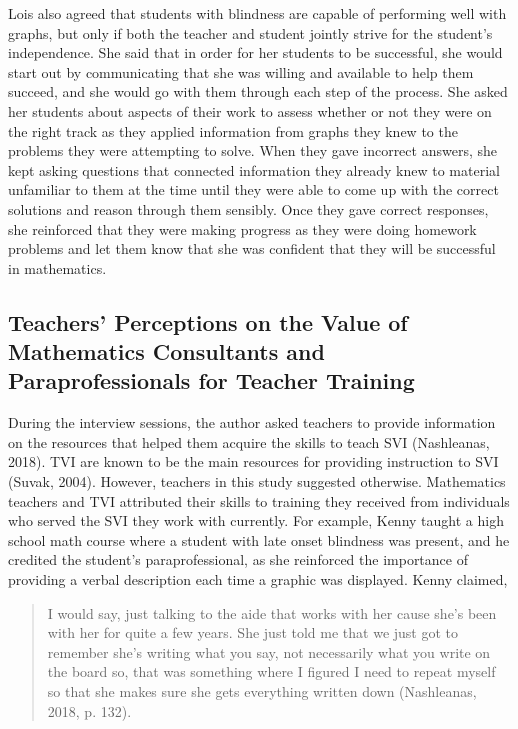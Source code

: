 \documentclass[11.5pt]{sig-alternate} %
\begin{document}
\begin{large}
\begin{quote}
\end{quote}

Lois also agreed that students with blindness are capable of performing well with graphs, but only if both the teacher and student jointly strive for the student's independence. She said that in order for her students to be successful, she would start out by communicating that she was willing and available to help them succeed, and she would go with them through each step of the process. She asked her students about aspects of their work to assess whether or not they were on the right track as they applied information from graphs they knew to the problems they were attempting to solve. When they gave incorrect answers, she kept asking questions that connected information they already knew to material unfamiliar to them at the time until they were able to come up with the correct solutions and reason through them sensibly. Once they gave correct responses, she reinforced that they were making progress as they were doing homework problems and let them know that she was confident that they will be successful in mathematics.
 
\subsection*{Teachers’ Perceptions on the Value of Mathematics Consultants and Paraprofessionals for Teacher Training}

During the interview sessions, the author asked teachers to provide information on the resources that helped them acquire the skills to teach SVI (Nashleanas, 2018). TVI are known to be the main resources for providing instruction to SVI (Suvak, 2004). However, teachers in this study suggested otherwise. Mathematics teachers and TVI attributed their skills to training they received from individuals who served the SVI they work with currently. For example, Kenny taught a high school math course where a student with late onset blindness was present, and he credited the student’s paraprofessional, as she reinforced the importance of providing a verbal description each time a graphic was displayed. Kenny claimed, 
 
\begin{quote}
I would say, just talking to the aide that works with her cause she’s been with her for quite a few years. She just told me that we just got to remember she’s writing what you say, not necessarily what you write on the board so, that was something where I figured I need to repeat myself so that she makes sure she gets everything written down (Nashleanas, 2018, p. 132).
\end{quote}


\end{large}
\end{document}
